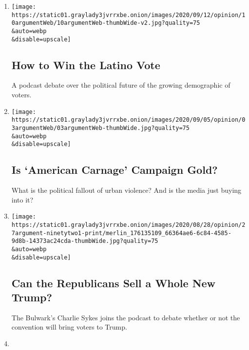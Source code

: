 \begin{enumerate}
\def\labelenumi{\arabic{enumi}.}
\item
  \href{/2020/09/11/opinion/the-argument-latino-2020-vote.html}{}

  \texttt{[image: https://static01.graylady3jvrrxbe.onion/images/2020/09/12/opinion/10argumentWeb/10argumentWeb-thumbWide-v2.jpg?quality=75\\\&auto=webp\\\&disable=upscale]}

  \hypertarget{how-to-win-the-latino-vote}{%
  \subsection{How to Win the Latino
  Vote}\label{how-to-win-the-latino-vote}}

  A podcast debate over the political future of the growing demographic
  of voters.
\item
  \href{/2020/09/03/opinion/the-argument-trump-biden-kenosha-portland.html}{}

  \texttt{[image: https://static01.graylady3jvrrxbe.onion/images/2020/09/05/opinion/03argumentWeb/03argumentWeb-thumbWide.jpg?quality=75\\\&auto=webp\\\&disable=upscale]}

  \hypertarget{is-american-carnage-campaign-gold}{%
  \subsection{Is `American Carnage' Campaign
  Gold?}\label{is-american-carnage-campaign-gold}}

  What is the political fallout of urban violence? And is the media just
  buying into it?
\item
  \href{/2020/08/27/opinion/the-argument-republican-convention-trump.html}{}

  \texttt{[image: https://static01.graylady3jvrrxbe.onion/images/2020/08/28/opinion/27argument-ninetytwo1-print/merlin\_176135109\_66364ae6-6c84-4585-9d8b-14373ac24cda-thumbWide.jpg?quality=75\\\&auto=webp\\\&disable=upscale]}

  \hypertarget{can-the-republicans-sell-a-whole-new-trump}{%
  \subsection{Can the Republicans Sell a Whole New
  Trump?}\label{can-the-republicans-sell-a-whole-new-trump}}

  The Bulwark's Charlie Sykes joins the podcast to debate whether or not
  the convention will bring voters to Trump.
\item
  \href{/2020/08/20/opinion/the-argument-democratic-convention-biden.html}{}


\end{enumerate}
